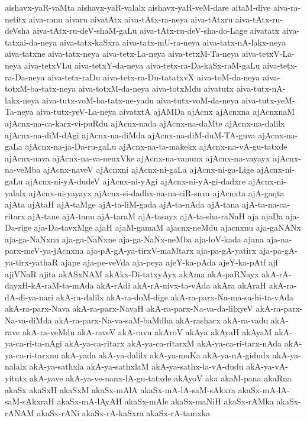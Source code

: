 {aishavx-yaR-vaMta
aishavx-yaR-valalx
aishavx-yaR-veM-dare
aitaM-dive
aiva-ra-netitx
aiva-ranu
aivaru
aivatAtx
aiva-tAtx-ra-neya
aiva-tAtxru
aiva-tAtx-ru-deVsha
aiva-tAtx-ru-deV-shaM-gaLu
aiva-tAtx-ru-deV-sha-do-Lage
aivatatx
aiva-tatxai-da-neya
aiva-tatx-kaSxra
aiva-tatx-mU-ra-neya
aiva-tatx-nA-lakx-neya
aiva-tatxne
aiva-tatx-neya
aiva-tetx-La-neya
aiva-tetxM-Ta-neya
aiva-tetxV-La-neya
aiva-tetxVLu
aiva-tetxY-da-neya
aiva-tetx-ra-Da-kaSx-raM-gaLu
aiva-tetx-ra-Da-neya
aiva-tetx-raDu
aiva-tetx-ra-Du-tatatxvX
aiva-toM-da-neya
aiva-totxM-ba-tatx-neya
aiva-totxM-da-neya
aiva-totxMdu
aivatutx
aiva-tutx-nA-lakx-neya
aiva-tutx-voM-ba-tatx-ne-yadu
aiva-tutx-voM-da-neya
aiva-tutx-yeM-Ta-neya
aiva-tutx-yeV-La-neya
aivatxtA
ajAMDa
ajAcnx
ajAcnxna
ajAcnxnaM
ajAcnx-na-ca-karx-vi-puRdu
ajAcnx-nada
ajAcnx-na-daMte
ajAcnx-na-dalilx
ajAcnx-na-diM-dAgi
ajAcnx-na-diMda
ajAcnx-na-diM-duM-TA-guva
ajAcnx-na-gaLa
ajAcnx-na-ja-Da-ru-gaLu
ajAcnx-na-ta-makekx
ajAcnx-na-vA-gu-tatxde
ajAcnx-nava
ajAcnx-na-va-nenxVke
ajAcnx-na-vanunx
ajAcnx-na-vayayx
ajAcnx-na-veMba
ajAcnx-naveV
ajAcnxni
ajAcnx-ni-gaLa
ajAcnx-ni-ga-Lige
ajAcnx-ni-gaLu
ajAcnx-ni-yA-dudeV
ajAcnx-ni-yAgi
ajAcnx-ni-yA-gi-dadxre
ajAcnx-ni-yalalx
ajAcnx-ni-yayayx
ajAcnx-si-dadhx-na-na-ciR-suva
ajAcnxta
ajA-gaqta
ajAta
ajAtaH
ajA-taMge
ajA-ta-liM-gada
ajA-ta-nAda
ajA-tana
ajA-ta-na-ca-ritarx
ajA-tane
ajA-tanu
ajA-taraM
ajA-tasayx
ajA-ta-sha-raNaH
aja
ajaDa
aja-Da-rige
aja-Da-tavxMge
ajaH
ajaM-gamaM
ajacnx-neMdu
ajacnxnu
aja-gaNANx
aja-ga-NaNxna
aja-ga-NaNxne
aja-ga-NaNx-neMba
aja-loV-kada
ajana
aja-na-parx-meV-ya-jAcnxna
aja-pA-gA-ya-tirxV-maMtarx
aja-pa-gA-yatirx
aja-pa-gA-ya-tirx-yathaR
ajape
aja-pe-veVda
aja-peya
ajeY-ka-pAda
ajeY-ka-pAtf
ajf
ajiVNaR
ajita
akASxNAM
akAkx-Di-tatxyAyx
akAma
akA-paRNayx
akA-rA-dayxH-kA-raM-ta-mAda
akA-rAdi
akA-rA-nivx-ta-vAda
akAra
akAraH
akA-ra-dA-di-ya-nari
akA-ra-dalilx
akA-ra-doM-dige
akA-ra-parx-Na-ma-sa-hi-ta-vAda
akA-ra-parx-Nava
akA-ra-parx-NavaH
akA-ra-parx-Na-va-da-lilxyeV
akA-ra-parx-Na-va-diMda
akA-ra-parx-Na-va-saM-baMdha
akA-rashacx
akA-ra-vadu
akA-rave
akA-ra-veMdu
akA-raveV
akA-ravu
akAroV
akAya
akAyaH
akAyaM
akA-ya-ca-ri-ta-nAgi
akA-ya-ca-ritarx
akA-ya-ca-ritarxM
akA-ya-ca-ri-tarx-nAda
akA-ya-ca-ri-tarxnu
akA-yada
akA-ya-dalilx
akA-ya-muKa
akA-ya-nA-gidudx
akA-ya-nalalx
akA-ya-sathxla
akA-ya-sathxlaM
akA-ya-sathx-la-vA-dudu
akA-ya-vA-yitutx
akA-yave
akA-ya-ve-nanx-lA-gu-tatxde
akAyoV
aka
akaM-pana
akaRna
akaSx
akaSxH
akaSxM
akaSx-mAlA
akaSx-mA-lA-saM-sAkxra
akaSx-mA-lA-saM-sAkxraH
akaSx-mA-lAyAH
akaSx-mAle
akaSx-maNiH
akaSx-rAMka
akaSx-rANAM
akaSx-rANi
akaSx-rA-kaSxra
akaSx-rA-tamxka
}
